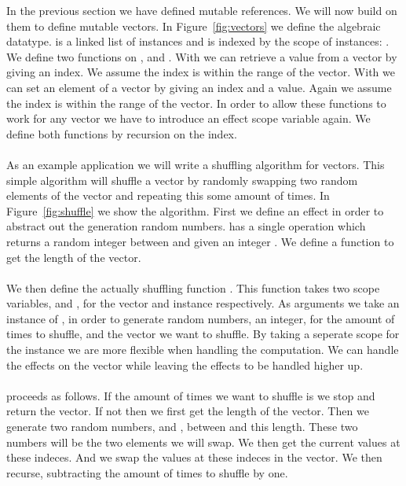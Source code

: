 In the previous section we have defined mutable references.
We will now build on them to define mutable vectors.
In Figure~\ref{fig:vectors} we define the  algebraic datatype.
 is a linked list of  instances and is indexed by the scope of instances: .
We define two functions on ,  and .
With  we can retrieve a value from a vector by giving an index.
We assume the index is within the range of the vector.
With  we can set an element of a vector by giving an index and a value.
Again we assume the index is within the range of the vector.
In order to allow these functions to work for any vector we have to introduce an effect scope variable  again.
We define both functions by recursion on the index.
\\\\
As an example application we will write a shuffling algorithm for vectors.
This simple algorithm will shuffle a vector by randomly swapping two random elements of the vector and repeating this some amount of times.
In Figure~\ref{fig:shuffle} we show the algorithm.
First we define an effect  in order to abstract out the generation random numbers.
 has a single operation  which returns a random integer between  and  given an integer .
We define a function  to get the length of the vector.
\\\\
We then define the actually shuffling function .
This function takes two scope variables,  and , for the vector and  instance respectively.
As arguments we take an instance of , in order to generate random numbers, an integer, for the amount of times to shuffle, and the vector we want to shuffle.
By taking a seperate scope for the  instance we are more flexible when handling the computation.
We can handle the effects on the vector while leaving the  effects to be handled higher up.
\\\\
 proceeds as follows.
If the amount of times we want to shuffle is  we stop and return the vector.
If not then we first get the length of the vector.
Then we generate two random numbers,  and , between  and this length.
These two numbers will be the two elements we will swap.
We then get the current values at these indeces.
And we swap the values at these indeces in the vector.
We then recurse, subtracting the amount of times to shuffle by one.

